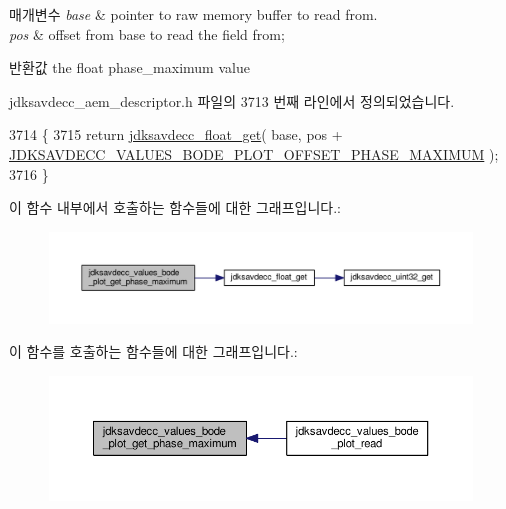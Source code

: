 \begin{DoxyParams}{매개변수}
{\em base} & pointer to raw memory buffer to read from. \\
\hline
{\em pos} & offset from base to read the field from; \\
\hline
\end{DoxyParams}
\begin{DoxyReturn}{반환값}
the float phase\+\_\+maximum value 
\end{DoxyReturn}


jdksavdecc\+\_\+aem\+\_\+descriptor.\+h 파일의 3713 번째 라인에서 정의되었습니다.


\begin{DoxyCode}
3714 \{
3715     \textcolor{keywordflow}{return} \hyperlink{group__endian_gadf6108d4d5f2936dd5018e4b80265c8c}{jdksavdecc\_float\_get}( base, pos + 
      \hyperlink{group__values__bode__plot_ga5dcf4b59c69da4cc9804826a4f63ed8d}{JDKSAVDECC\_VALUES\_BODE\_PLOT\_OFFSET\_PHASE\_MAXIMUM} );
3716 \}
\end{DoxyCode}


이 함수 내부에서 호출하는 함수들에 대한 그래프입니다.\+:
\nopagebreak
\begin{figure}[H]
\begin{center}
\leavevmode
\includegraphics[width=350pt]{group__values__bode__plot_ga42e4ab45e4b3ad676174f57d4dbd1c89_cgraph}
\end{center}
\end{figure}




이 함수를 호출하는 함수들에 대한 그래프입니다.\+:
\nopagebreak
\begin{figure}[H]
\begin{center}
\leavevmode
\includegraphics[width=350pt]{group__values__bode__plot_ga42e4ab45e4b3ad676174f57d4dbd1c89_icgraph}
\end{center}
\end{figure}


